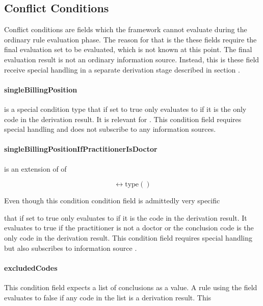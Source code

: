 \subsection{Conflict Conditions}\label{subsec:conflict-conditions}
Conflict conditions are fields which the framework cannot evaluate during the ordinary rule evaluation phase.
The reason for that is the these fields require the final evaluation set to be evaluated, which is not known at this point.
The final evaluation result is not an ordinary information source.
Instead, this is these field receive special handling in a separate derivation stage described in section \addref.

\paragraph{singleBillingPosition}
 is a special condition type that if set to true only evaluates to  if it is the only code in the derivation result.
It is relevant for .
This condition field requires special handling and does not subscribe to any information sources.

\paragraph{singleBillingPositionIfPractitionerIsDoctor}
 is an extension of of 

{}
\[
     \leftrightarrow \text{type}\left(  \right)
\]

Even though this condition  condition field is admittedly very specific

that if set to true only evaluates to  if it is the code in the derivation result.
It evaluates to true if the practitioner is not a doctor or the conclusion code is the only code in the derivation result.
This condition field requires special handling but also subscribes to information source .

\paragraph{excludedCodes}
This condition field expects a list of conclusions as a value.
A rule using the  field evaluates to false if any code in the  list is a derivation result.
This



